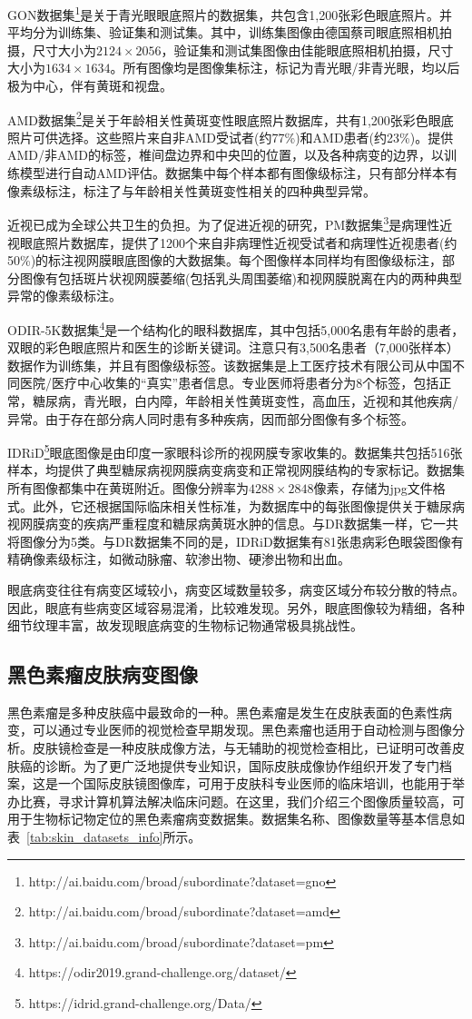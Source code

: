 GON数据集\footnote{http://ai.baidu.com/broad/subordinate?dataset=gno}是关于青光眼眼底照片的数据集，共包含1,200张彩色眼底照片。并平均分为训练集、验证集和测试集。其中，训练集图像由德国蔡司眼底照相机拍摄，尺寸大小为$2124\times 2056$，验证集和测试集图像由佳能眼底照相机拍摄，尺寸大小为$1634\times 1634 $。所有图像均是图像集标注，标记为青光眼/非青光眼，均以后极为中心，伴有黄斑和视盘。

AMD数据集\footnote{http://ai.baidu.com/broad/subordinate?dataset=amd}是关于年龄相关性黄斑变性眼底照片数据库，共有1,200张彩色眼底照片可供选择。这些照片来自非AMD受试者(约77\%)和AMD患者(约23\%)。提供AMD/非AMD的标签，椎间盘边界和中央凹的位置，以及各种病变的边界，以训练模型进行自动AMD评估。数据集中每个样本都有图像级标注，只有部分样本有像素级标注，标注了与年龄相关性黄斑变性相关的四种典型异常。

近视已成为全球公共卫生的负担。为了促进近视的研究，PM数据集\footnote{http://ai.baidu.com/broad/subordinate?dataset=pm}是病理性近视眼底照片数据库，提供了1200个来自非病理性近视受试者和病理性近视患者(约50\%)的标注视网膜眼底图像的大数据集。每个图像样本同样均有图像级标注，部分图像有包括斑片状视网膜萎缩(包括乳头周围萎缩)和视网膜脱离在内的两种典型异常的像素级标注。

ODIR-5K数据集\footnote{https://odir2019.grand-challenge.org/dataset/}是一个结构化的眼科数据库，其中包括5,000名患有年龄的患者，双眼的彩色眼底照片和医生的诊断关键词。注意只有3,500名患者（7,000张样本）数据作为训练集，并且有图像级标签。该数据集是上工医疗技术有限公司从中国不同医院/医疗中心收集的“真实”患者信息。专业医师将患者分为8个标签，包括正常，糖尿病，青光眼，白内障，年龄相关性黄斑变性，高血压，近视和其他疾病/异常。由于存在部分病人同时患有多种疾病，因而部分图像有多个标签。

IDRiD\footnote{https://idrid.grand-challenge.org/Data/}眼底图像是由印度一家眼科诊所的视网膜专家收集的。数据集共包括516张样本，均提供了典型糖尿病视网膜病变病变和正常视网膜结构的专家标记。数据集所有图像都集中在黄斑附近。图像分辨率为$4288\times 2848$像素，存储为jpg文件格式。此外，它还根据国际临床相关性标准，为数据库中的每张图像提供关于糖尿病视网膜病变的疾病严重程度和糖尿病黄斑水肿的信息。与DR数据集一样，它一共将图像分为5类。与DR数据集不同的是，IDRiD数据集有81张患病彩色眼袋图像有精确像素级标注，如微动脉瘤、软渗出物、硬渗出物和出血。

眼底病变往往有病变区域较小，病变区域数量较多，病变区域分布较分散的特点。因此，眼底有些病变区域容易混淆，比较难发现。另外，眼底图像较为精细，各种细节纹理丰富，故发现眼底病变的生物标记物通常极具挑战性。

\subsection{黑色素瘤皮肤病变图像}
黑色素瘤是多种皮肤癌中最致命的一种。黑色素瘤是发生在皮肤表面的色素性病变，可以通过专业医师的视觉检查早期发现。黑色素瘤也适用于自动检测与图像分析。皮肤镜检查是一种皮肤成像方法，与无辅助的视觉检查相比，已证明可改善皮肤癌的诊断。为了更广泛地提供专业知识，国际皮肤成像协作组织开发了专门档案，这是一个国际皮肤镜图像库，可用于皮肤科专业医师的临床培训，也能用于举办比赛，寻求计算机算法解决临床问题。在这里，我们介绍三个图像质量较高，可用于生物标记物定位的黑色素瘤病变数据集。数据集名称、图像数量等基本信息如表~\ref{tab:skin_datasets_info}所示。


